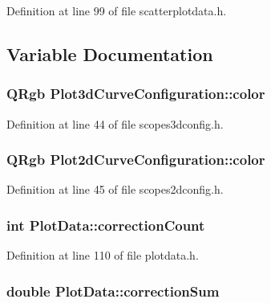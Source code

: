 \-Definition at line 99 of file scatterplotdata.\-h.



\subsection{\-Variable \-Documentation}
\hypertarget{group___scope_plugin_gab12e6f531f6e4242ccbb585aec40b245}{
\subsubsection[{color}]{\setlength{\rightskip}{0pt plus 5cm}\-Q\-Rgb {\bf \-Plot3d\-Curve\-Configuration\-::color}}}\label{group___scope_plugin_gab12e6f531f6e4242ccbb585aec40b245}


\-Definition at line 44 of file scopes3dconfig.\-h.

\hypertarget{group___scope_plugin_ga287675d34d68fc61f7de6bc82fed788d}{
\subsubsection[{color}]{\setlength{\rightskip}{0pt plus 5cm}\-Q\-Rgb {\bf \-Plot2d\-Curve\-Configuration\-::color}}}\label{group___scope_plugin_ga287675d34d68fc61f7de6bc82fed788d}


\-Definition at line 45 of file scopes2dconfig.\-h.

\hypertarget{group___scope_plugin_ga85cd1767be2be06460ecbbd11b9ec366}{
\subsubsection[{correction\-Count}]{\setlength{\rightskip}{0pt plus 5cm}int {\bf \-Plot\-Data\-::correction\-Count}}}\label{group___scope_plugin_ga85cd1767be2be06460ecbbd11b9ec366}


\-Definition at line 110 of file plotdata.\-h.

\hypertarget{group___scope_plugin_ga802021e218f3dadce03011cdeea7d90b}{
\subsubsection[{correction\-Sum}]{\setlength{\rightskip}{0pt plus 5cm}double {\bf \-Plot\-Data\-::correction\-Sum}}}\label{group___scope_plugin_ga802021e218f3dadce03011cdeea7d90b}


